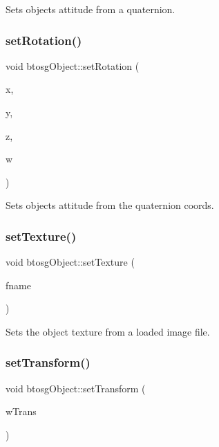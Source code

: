 Sets objects attitude from a quaternion. \mbox{\label{classbtosgObject_a4d21ca59b944fd26644db35d3e9ba67a}} 
\subsubsection{\texorpdfstring{setRotation()}{setRotation()}\hspace{0.1cm}{\footnotesize\ttfamily [2/2]}}
{\footnotesize\ttfamily void btosg\+Object\+::set\+Rotation (\begin{DoxyParamCaption}\item[{float}]{x,  }\item[{float}]{y,  }\item[{float}]{z,  }\item[{float}]{w }\end{DoxyParamCaption})\hspace{0.3cm}{\ttfamily [inline]}}

Sets objects attitude from the quaternion coords. \mbox{\label{classbtosgObject_aff54acbc7c66811efb0cf2838107a241}} 
\subsubsection{\texorpdfstring{setTexture()}{setTexture()}}
{\footnotesize\ttfamily void btosg\+Object\+::set\+Texture (\begin{DoxyParamCaption}\item[{char const $\ast$}]{fname }\end{DoxyParamCaption})}

Sets the object texture from a loaded image file. \mbox{\label{classbtosgObject_ad33fcab26c0c83ccab6dca6906e8cdb0}} 
\subsubsection{\texorpdfstring{setTransform()}{setTransform()}}
{\footnotesize\ttfamily void btosg\+Object\+::set\+Transform (\begin{DoxyParamCaption}\item[{const bt\+Transform \&}]{w\+Trans }\end{DoxyParamCaption})\hspace{0.3cm}{\ttfamily [inline]}}

